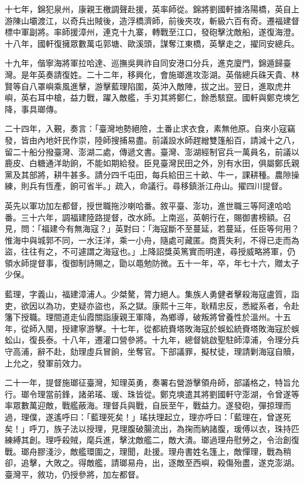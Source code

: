 \begin{pinyinscope}
十七年，錦犯泉州，康親王檄調聲赴援，英率師從。錦將劉國軒據洛陽橋，英自上游陳山壩渡江，以奇兵出賊後，造浮橋濟師，前後夾攻，斬級六百有奇。遷福建督標中軍副將。率師援漳州，連克十九寨，轉戰至江口，發砲擊沈敵船，遂復海澄。十八年，國軒復擁眾數萬屯郭塘、歐溪頭，謀奪江東橋，英擊走之，擢同安總兵。

十九年，偕寧海將軍拉哈達、巡撫吳興祚自同安港口分兵，進克廈門，錦遁歸臺灣。是年英奏請復姓。二十二年，移興化，會施瑯進攻澎湖。英偕總兵硃天貴、林賢等自八罩嶼乘風進擊，游擊藍理陷圍，英沖入敵陣，拔之出。翌日，進取虎井嶼，英右耳中槍，益力戰，躍入敵艦，手刃其將鄭仁，餘悉駭竄。國軒與鄭克塽乞降，事具瑯傳。

二十四年，入覲，奏言：「臺灣地勢絕險，土番止求衣食，素無他原。自來小寇竊發，皆由內地奸民作崇，陸師搜捕易盡。前議設水師趕繒雙篷船百，請減十之八，留二十船分撥臺灣、澎湖二處，傳遞文書。臺灣、澎湖經制官兵一萬員名，前議以鹿皮、白糖通洋助餉，不能如期給發。臣見臺灣民田之外，別有水田，俱屬鄭氏親黨及其部將，耕牛甚多。請分四千屯田，每兵給田三十畝、牛一，課耕種。農隙操練，則兵有恆產，餉可省半。」疏入，命議行。尋移鎮浙江舟山。擢四川提督。

英先以軍功加左都督，授世職拖沙喇哈番。敘平臺、澎功，進世職三等阿達哈哈番。三十六年，調福建陸路提督，改水師。上南巡，英朝行在，賜御書榜額。召見，問：「福建今有無海寇？」英對曰：「海寇斷不至蔓延，若蔓延，任臣等何用？惟海中與城郭不同，一水汪洋，乘一小舟，隨處可藏匿。商賈失利，不得已走而為盜，往往有之，不可遽謂之海寇也。」上降詔獎英篤實而明達，尋授威略將軍，仍領水師提督事，復御制詩賜之，勖以黽勉防微。五十一年，卒，年七十六，贈太子少保。

藍理，字義山，福建漳浦人。少桀驁，膂力絕人。集族人勇健者擊殺海寇盧質，詣吏，欲因以為功，吏疑亦盜也，系之獄。康熙十三年，耿精忠反，悉縱系者，令赴籓下授職。理間道走仙霞關詣康親王軍降，為鄉導，破叛將曾養性於溫州。十五年，從師入閩，授建寧游擊。十七年，從都統賚塔敗海寇於蜈蚣統賚塔敗海寇於蜈蚣山，復長泰。十八年，遷灌口營參將。十九年，總督姚啟聖駐師漳浦，令理分兵守高浦，辭不赴，劾理虛兵冒餉，坐奪官。下部議罪，擬杖徒，理請剿海寇自贖，上允之，發軍前效力。

二十一年，提督施瑯征臺灣，知理英勇，奏署右營游擊領舟師，部議格之，特旨允行。瑯令理當前鋒，諸弟瑤、瑗、珠皆從。鄭克塽遣其將劉國軒守澎湖，令曾遂等率眾數萬迎敵，戰艦蔽海。理督兵與戰，自辰至午，戰益力。遂發砲，彈掠理而過，理僕，遂遙呼曰：「藍理死矣！」瑤扶理起立，理亦呼曰：「藍理在，曾遂死矣！」呼刀，族子法以授理，見理腹破腸流出，為掬而納諸腹，瑗傅以衣，珠持匹練縛其創。理呼殺賊，麾兵進，擊沈敵艦二，敵大潰。瑯過理舟慰勞之，令治創復戰。瑯舟膠淺沙，敵艦環圍之，理聞，赴援。理舟書姓名篷上，敵憚理，戰為稍卻，追擊，大敗之。得敵艦，請瑯易舟，出，逐敵至西嶼，殺傷殆盡，遂克澎湖。臺灣平，敘功，仍授參將，加左都督。


\end{pinyinscope}

